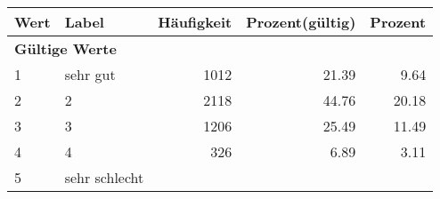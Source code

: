      \begin{longtable}{lXrrr}
     \toprule
     \textbf{Wert} & \textbf{Label} & \textbf{Häufigkeit} & \textbf{Prozent(gültig)} & \textbf{Prozent} \\
     \endhead
     \midrule
     \multicolumn{5}{l}{\textbf{Gültige Werte}}\\

     1 &
     \multicolumn{1}{X}{ sehr gut   } &


       \num{1012} &
       \num[round-mode=places,round-precision=2]{21,39} &
         \num[round-mode=places,round-precision=2]{9,64} \\

     2 &
     \multicolumn{1}{X}{ 2   } &


       \num{2118} &
       \num[round-mode=places,round-precision=2]{44,76} &
         \num[round-mode=places,round-precision=2]{20,18} \\

     3 &
     \multicolumn{1}{X}{ 3   } &


       \num{1206} &
       \num[round-mode=places,round-precision=2]{25,49} &
         \num[round-mode=places,round-precision=2]{11,49} \\

     4 &
     \multicolumn{1}{X}{ 4   } &


       \num{326} &
       \num[round-mode=places,round-precision=2]{6,89} &
         \num[round-mode=places,round-precision=2]{3,11} \\

     5 &
     \multicolumn{1}{X}{ sehr schlecht   } &



\end{longtable}
